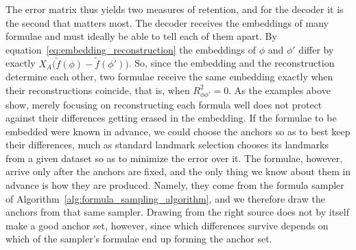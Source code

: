 \documentclass[titlepage,a4paper,11pt]{report}
\begin{document}
    The error matrix thus yields two measures of retention, and for the decoder it is the second that matters most. The decoder receives the embeddings of many formulae and must ideally be able to tell each of them apart. By equation~\eqref{eq:embedding_reconstruction} the embeddings of $\phi$ and $\phi'$ differ by exactly $X_A\bigl(\tilde f(\phi)-\tilde f(\phi')\bigr)$. So, since the embedding and the reconstruction determine each other, two formulae receive the same embedding exactly when their reconstructions coincide, that is, when $R^2_{\phi\phi'}=0$. As the examples above show, merely focusing on reconstructing each formula well does not protect against their differences getting erased in the embedding. If the formulae to be embedded were known in advance, we could choose the anchors so as to best keep their differences, much as standard landmark selection chooses its landmarks from a given dataset so as to minimize the error over it. The formulae, however, arrive only after the anchors are fixed, and the only thing we know about them in advance is how they are produced. Namely, they come from the formula sampler of Algorithm~\ref{alg:formula_sampling_algorithm}, and we therefore draw the anchors from that same sampler. Drawing from the right source does not by itself make a good anchor set, however, since which differences survive depends on which of the sampler's formulae end up forming the anchor set.
\end{document}
